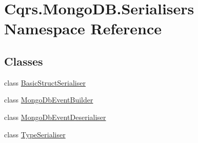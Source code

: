 \hypertarget{namespaceCqrs_1_1MongoDB_1_1Serialisers}{}\section{Cqrs.\+Mongo\+D\+B.\+Serialisers Namespace Reference}
\label{namespaceCqrs_1_1MongoDB_1_1Serialisers}
\subsection*{Classes}
\begin{DoxyCompactItemize}
\item 
class \hyperlink{classCqrs_1_1MongoDB_1_1Serialisers_1_1BasicStructSerialiser}{Basic\+Struct\+Serialiser}
\item 
class \hyperlink{classCqrs_1_1MongoDB_1_1Serialisers_1_1MongoDbEventBuilder}{Mongo\+Db\+Event\+Builder}
\item 
class \hyperlink{classCqrs_1_1MongoDB_1_1Serialisers_1_1MongoDbEventDeserialiser}{Mongo\+Db\+Event\+Deserialiser}
\item 
class \hyperlink{classCqrs_1_1MongoDB_1_1Serialisers_1_1TypeSerialiser}{Type\+Serialiser}
\end{DoxyCompactItemize}
